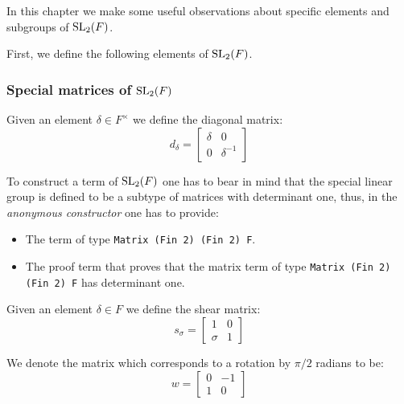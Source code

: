 In this chapter we make some useful observations about specific elements and subgroups of $\operatorname{SL}_2(F)$. 

First, we define the following elements of $\operatorname{SL}_2(F)$.

\subsubsection{Special matrices of $\operatorname{SL}_2(F)$}

\begin{definition}
\label{SpecialMatrices.d}
\leanok
    Given an element $\delta \in F^\times$ we define the diagonal matrix:
    \[
    d_\delta = \begin{bmatrix}
        \delta & 0\\
        0 & \delta^{-1}
    \end{bmatrix}
    \]
\end{definition}


\begin{remark}
    To construct a term of $\operatorname{SL}_2(F)$ one has to bear in mind that the special linear group is defined to
    be a subtype of matrices with determinant one, thus, in the \textit{anonymous constructor}
    one has to provide:

    \begin{itemize}
        \item The term of type \texttt{Matrix (Fin 2) (Fin 2) F}.
        \item The proof term that proves that the matrix term of type \texttt{Matrix (Fin 2) (Fin 2) F} has determinant one.
    \end{itemize}
\end{remark}

\begin{definition}
\label{SpecialMatrices.s}
\leanok
    Given an element $\delta \in F$ we define the shear matrix:
    \[
    s_\sigma  = \begin{bmatrix}
    1 & 0\\
    \sigma & 1
    \end{bmatrix}
    \]
\end{definition}


\begin{definition}
\label{SpecialMatrices.w}
\leanok
 We denote the matrix which corresponds to a rotation by $\pi / 2$ radians to be:
 \[
 w = \begin{bmatrix}
    0 & -1\\
    1 & 0
 \end{bmatrix}
 \]
\end{definition}


